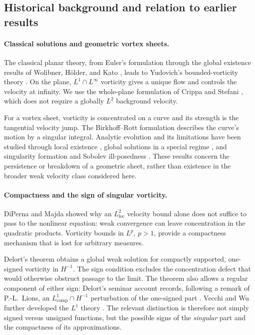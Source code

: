 \documentclass[11pt,a4paper,reqno]{amsart}
\theoremstyle{plain}
\theoremstyle{definition}
\theoremstyle{remark}
\numberwithin{equation}{section}
\begin{document}
\subsection{Historical background and relation to earlier results}

\paragraph{Classical solutions and geometric vortex sheets.}
The classical planar theory, from Euler's formulation
\cite{Euler} through the global existence results of Wolibner,
H\"older, and Kato \cite{Wolibner,Holder,Kato}, leads to
Yudovich's bounded-vorticity theory \cite{Yudovich}. On the plane,
$L^1\cap L^\infty$ vorticity gives a unique flow and controls the
velocity at infinity. We use the whole-plane formulation of Crippa
and Stefani \cite[Definition~3.2 and Theorem~3.3]{CS}, which does
not require a globally $L^2$ background velocity.

For a vortex sheet, vorticity is concentrated on a curve and its
strength is the tangential velocity jump. The Birkhoff--Rott
formulation \cite{Rott,Birkhoff} describes the curve's motion by a
singular integral. Analytic evolution and its limitations have been
studied through local existence \cite{SulemEtAl}, global solutions
in a special regime \cite{DuchonRobert}, and singularity formation
and Sobolev ill-posedness \cite{CaflischOrellana}. These results
concern the persistence or breakdown of a geometric sheet, rather
than existence in the broader weak velocity class considered here.

\paragraph{Compactness and the sign of singular vorticity.}
DiPerna and Majda \cite{DiPernaMajda87,DiPernaMajda88} showed why
an $L^2_{\mathrm{loc}}$ velocity bound alone does not suffice to pass
to the nonlinear equation: weak convergence can leave concentration
in the quadratic products. Vorticity bounds in $L^p$, $p>1$, provide
a compactness mechanism that is lost for arbitrary measures.

Delort's theorem \cite{Delort} obtains a global weak solution for
compactly supported, one-signed vorticity in $H^{-1}$. The sign
condition excludes the concentration defect that would otherwise
obstruct passage to the limit. The theorem also allows a regular
component of either sign: Delort's seminar account records, following
a remark of P.-L.~Lions, an $L^1_{\mathrm{comp}}\cap H^{-1}$
perturbation of the one-signed part
\cite[\S4, p.~II--9 and its footnote]{DelortSem}. Vecchi and Wu
further developed the $L^1$ theory \cite{VecchiWu}. The relevant
distinction is therefore not simply signed versus unsigned functions,
but the possible signs of the \emph{singular} part and the
compactness of its approximations.
\end{document}
